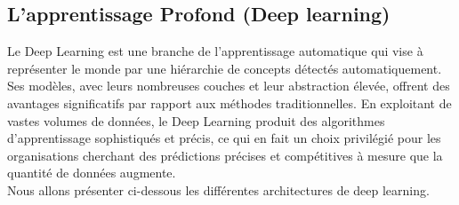 \documentclass{report}
\begin{document}
 \subsection{L'apprentissage Profond (Deep learning)}
Le Deep Learning est une branche de l'apprentissage automatique qui vise à représenter le monde par une hiérarchie de concepts détectés automatiquement. Ses modèles, avec leurs nombreuses couches et leur abstraction élevée, offrent des avantages significatifs par rapport aux méthodes traditionnelles. En exploitant de vastes volumes de données, le Deep Learning produit des algorithmes d'apprentissage sophistiqués et précis, ce qui en fait un choix privilégié pour les organisations cherchant des prédictions précises et compétitives à mesure que la quantité de données augmente.\cite{Mohammad Mustafa Taye,2023} \\

Nous allons présenter ci-dessous les différentes architectures de deep learning.
\end{document}
